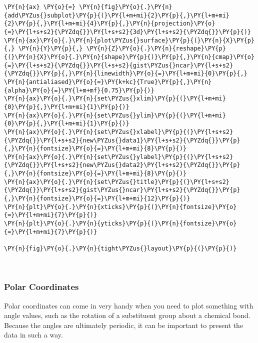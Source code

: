 \begin{tcolorbox}[breakable, size=fbox, boxrule=1pt, pad at break*=1mm,colback=cellbackground, colframe=cellborder]
\begin{Verbatim}[commandchars=\\\{\}]
\PY{n}{ax} \PY{o}{=} \PY{n}{fig}\PY{o}{.}\PY{n}{add\PYZus{}subplot}\PY{p}{(}\PY{l+m+mi}{2}\PY{p}{,}\PY{l+m+mi}{2}\PY{p}{,}\PY{l+m+mi}{4}\PY{p}{,}\PY{n}{projection}\PY{o}{=}\PY{l+s+s2}{\PYZdq{}}\PY{l+s+s2}{3d}\PY{l+s+s2}{\PYZdq{}}\PY{p}{)}
\PY{n}{ax}\PY{o}{.}\PY{n}{plot\PYZus{}surface}\PY{p}{(}\PY{n}{X}\PY{p}{,} \PY{n}{Y}\PY{p}{,} \PY{n}{Z}\PY{o}{.}\PY{n}{reshape}\PY{p}{(}\PY{n}{X}\PY{o}{.}\PY{n}{shape}\PY{p}{)}\PY{p}{,}\PY{n}{cmap}\PY{o}{=}\PY{l+s+s2}{\PYZdq{}}\PY{l+s+s2}{gist\PYZus{}ncar}\PY{l+s+s2}{\PYZdq{}}\PY{p}{,}\PY{n}{linewidth}\PY{o}{=}\PY{l+m+mi}{0}\PY{p}{,} \PY{n}{antialiased}\PY{o}{=}\PY{k+kc}{True}\PY{p}{,}\PY{n}{alpha}\PY{o}{=}\PY{l+m+mf}{0.75}\PY{p}{)}
\PY{n}{ax}\PY{o}{.}\PY{n}{set\PYZus{}xlim}\PY{p}{(}\PY{l+m+mi}{0}\PY{p}{,}\PY{l+m+mi}{1}\PY{p}{)}
\PY{n}{ax}\PY{o}{.}\PY{n}{set\PYZus{}ylim}\PY{p}{(}\PY{l+m+mi}{0}\PY{p}{,}\PY{l+m+mi}{1}\PY{p}{)}
\PY{n}{ax}\PY{o}{.}\PY{n}{set\PYZus{}xlabel}\PY{p}{(}\PY{l+s+s2}{\PYZdq{}}\PY{l+s+s2}{new\PYZus{}data1}\PY{l+s+s2}{\PYZdq{}}\PY{p}{,}\PY{n}{fontsize}\PY{o}{=}\PY{l+m+mi}{8}\PY{p}{)}
\PY{n}{ax}\PY{o}{.}\PY{n}{set\PYZus{}ylabel}\PY{p}{(}\PY{l+s+s2}{\PYZdq{}}\PY{l+s+s2}{new\PYZus{}data2}\PY{l+s+s2}{\PYZdq{}}\PY{p}{,}\PY{n}{fontsize}\PY{o}{=}\PY{l+m+mi}{8}\PY{p}{)}
\PY{n}{ax}\PY{o}{.}\PY{n}{set\PYZus{}title}\PY{p}{(}\PY{l+s+s2}{\PYZdq{}}\PY{l+s+s2}{gist\PYZus{}ncar}\PY{l+s+s2}{\PYZdq{}}\PY{p}{,}\PY{n}{fontsize}\PY{o}{=}\PY{l+m+mi}{12}\PY{p}{)}
\PY{n}{plt}\PY{o}{.}\PY{n}{xticks}\PY{p}{(}\PY{n}{fontsize}\PY{o}{=}\PY{l+m+mi}{7}\PY{p}{)}
\PY{n}{plt}\PY{o}{.}\PY{n}{yticks}\PY{p}{(}\PY{n}{fontsize}\PY{o}{=}\PY{l+m+mi}{7}\PY{p}{)}

\PY{n}{fig}\PY{o}{.}\PY{n}{tight\PYZus{}layout}\PY{p}{(}\PY{p}{)}
\end{Verbatim}
\end{tcolorbox}

    \begin{center}
    \end{center}
    { \hspace*{\fill} \\}
    
    \hypertarget{polar-coordinates}{%
\subsubsection{Polar Coordinates}\label{polar-coordinates}}

Polar coordinates can come in very handy when you need to plot something
with angle values, such as the rotation of a substituent group about a
chemical bond. Because the angles are ultimately periodic, it can be
important to present the data in such a way.

